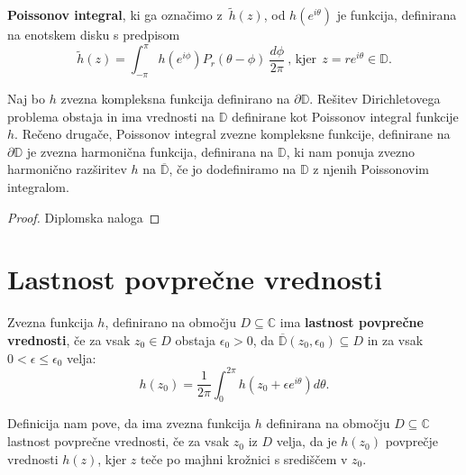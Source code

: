 \documentclass{article}
\begin{document}
    \begin{defi}
        \textbf{Poissonov integral}, ki ga označimo z~$\widetilde{h}(z)$, od $h(e^{i\theta})$ je funkcija, definirana na enotskem disku s predpisom
        $$
        \widetilde{h}(z) = \int_{-\pi}^{\pi}{h(e^{i\phi}) P_r(\theta - \phi)~\frac{d\phi}{2 \pi}}~\text{, kjer}~~z = r e^{i\theta} \in \mathbb{D}.
        $$
     \end{defi}
     \begin{trditev}
        Naj bo $h$ zvezna kompleksna funkcija definirano na $\partial \mathbb{D}$. Rešitev Dirichletovega problema obstaja in ima vrednosti na $\mathbb{D}$ definirane kot Poissonov integral funkcije $h$.
        \newline
        Rečeno drugače, Poissonov integral zvezne kompleksne funkcije, definirane na $\partial \mathbb{D}$ je zvezna harmonična funkcija, definirana na $\mathbb{D}$, ki nam ponuja zvezno harmonično razširitev $h$ na $\overline{\mathbb{D}}$, če jo dodefiniramo na $\mathbb{D}$ z njenih Poissonovim integralom.
     \end{trditev}
     \begin{proof}
        Diplomska naloga
     \end{proof}

\section{Lastnost povprečne vrednosti}
     \begin{defi}
        Zvezna funkcija $h$, definirano na območju $D \subseteq \mathbb{C}$ ima \textbf{lastnost povprečne vrednosti}, če za vsak $z_0 \in D$ obstaja $\epsilon_0 > 0$, da $\overline{\mathbb{D}}(z_0, \epsilon_0) \subseteq D$ in za vsak $0 < \epsilon \leq \epsilon_0 $ velja:
        $$
            h(z_0) = \frac{1}{2 \pi} \int_{0}^{2 \pi}{h(z_0 + \epsilon e^{i \theta}) d\theta}.
        $$
    \end{defi}
    \begin{op}
        Definicija nam pove, da ima zvezna funkcija $h$ definirana na območju $D \subseteq \mathbb{C}$ lastnost povprečne vrednosti, če za vsak $z_0$ iz $D$ velja, 
        da je $h(z_0)$ povprečje vrednosti $h(z)$, kjer $z$ teče po majhni krožnici s središčem v $z_0$.
    \end{op}
\end{document}
